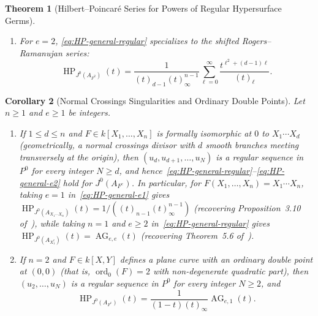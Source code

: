 \documentclass[a4paper, 12pt, reqno]{amsart}
\newtheorem{theorem}{Theorem}[section]
\newtheorem{corollary}[theorem]{Corollary}
\theoremstyle{remark}
\begin{document}
\begin{theorem}[Hilbert--Poincaré Series for Powers of Regular Hypersurface Germs]
\begin{enumerate}
    so both sums in~\eqref{eq:HP-general-regular} collapse to $1$,
    yielding
    \begin{equation}
      \label{eq:HP-general-e1}
      \operatorname{HP}_{J^0(A_F)}(t) = \frac{1}{(t)_{d - 1}(t)_\infty^{n - 1}}.
    \end{equation}
  \item For $e = 2$,
    \eqref{eq:HP-general-regular} specializes to the shifted Rogers--Ramanujan series:
    \begin{equation}
      \label{eq:HP-general-e2}
      \operatorname{HP}_{J^0(A_{F^2})}(t) = \frac{1}{(t)_{d - 1}(t)_\infty^{n - 1}} \sum_{\ell = 0}^\infty \frac{t^{\ell^2 + (d - 1)\ell}}{(t)_\ell}.
    \end{equation}
  \end{enumerate}
\end{theorem}

\begin{corollary}[Normal Crossings Singularities and Ordinary Double Points]
  \label{cor:normal-crossings}
  Let $n \ge 1$ and $e \ge 1$ be integers.
  \begin{enumerate}
  \item If $1 \le d \le n$ and $F \in k[X_1, \dots, X_n]$ is formally isomorphic at $0$ to $X_1 \cdots X_d$
    (geometrically, a normal crossings divisor with $d$ smooth branches meeting transversely at the origin),
    then $(u_d, u_{d + 1}, \dots, u_N)$ is a regular sequence in $P^0$ for every integer $N \ge d$,
    and hence~\eqref{eq:HP-general-regular}--\eqref{eq:HP-general-e2} hold for $J^0(A_{F^e})$.
    In particular,
    for $F(X_1, \dots, X_n) = X_1 \cdots X_n$,
    taking $e = 1$ in~\eqref{eq:HP-general-e1} gives $\operatorname{HP}_{J^0(A_{X_1 \cdots X_n})}(t) = 1 / ((t)_{n - 1}(t)_\infty^{n - 1})$ (recovering Proposition~3.10 of~\cite{bruschek_arc_2013}),
    while taking $n = 1$ and $e \ge 2$ in~\eqref{eq:HP-general-regular} gives $\operatorname{HP}_{J^0(A_{X_1^e})}(t) = \operatorname{AG}_{e, e}(t)$ (recovering Theorem~5.6 of~\cite{bruschek_arc_2013}).
  \item If $n = 2$ and $F \in k[X, Y]$ defines a plane curve with an ordinary double point at $(0, 0)$
    (that is, $\operatorname{ord}_0(F) = 2$ with non-degenerate quadratic part),
    then $(u_2, \dots, u_N)$ is a regular sequence in $P^0$ for every integer $N \ge 2$,
    and
    \begin{equation}
      \label{eq:HP-xye}
      \operatorname{HP}_{J^0(A_{F^e})}(t) = \frac{1}{(1 - t)(t)_\infty}\operatorname{AG}_{e, 1}(t).
    \end{equation}
  \end{enumerate}
\end{corollary}
\end{document}
